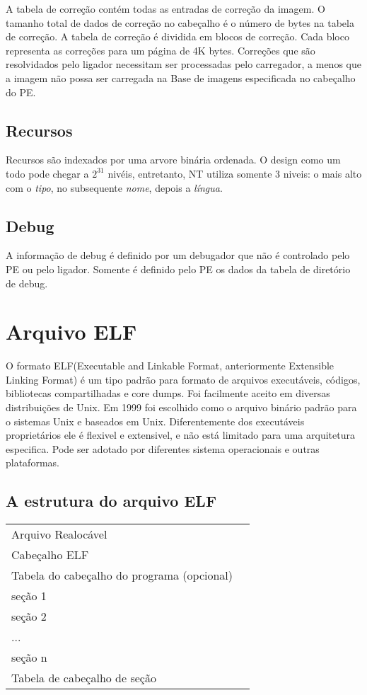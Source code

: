 A tabela de correção contém todas as entradas de correção da imagem.
O tamanho total de dados de correção no cabeçalho é o número de bytes
na tabela de correção. A tabela de correção é dividida em blocos de
correção. Cada bloco representa as correções para um página de 4K
bytes. Correções que são resolvidados pelo ligador necessitam ser
processadas pelo carregador, a menos que a imagem não possa ser carregada
na Base de imagens especificada no cabeçalho do PE.


\subsection{Recursos}


Recursos são indexados por uma arvore binária ordenada. O design
como um todo pode chegar a $2^{31}$ nivéis, entretanto, NT utiliza
somente 3 niveis: o mais alto com o \emph{tipo}, no subsequente \emph{nome},
depois a \emph{língua}.


\subsection{Debug}


A informação de debug é definido por um debugador que não é controlado
pelo PE ou pelo ligador. Somente é definido pelo PE os dados da tabela
de diretório de debug.


\section{Arquivo ELF}
   O formato ELF(Executable and Linkable Format, anteriormente Extensible Linking Format) é um tipo padrão para formato de arquivos executáveis, códigos, bibliotecas compartilhadas e core dumps. Foi facilmente aceito em diversas distribuições de Unix. 
   Em 1999 foi escolhido como o arquivo binário padrão para o sistemas Unix e baseados em Unix. Diferentemente dos executáveis proprietários ele é flexivel e extensivel, e não está limitado para uma arquitetura especifica. Pode ser adotado por diferentes sistema operacionais e outras plataformas.

\subsection{A estrutura do arquivo ELF}

\begin{list}{}
\item {\begin{tabular}{|l|c|}
\hline
 Arquivo Realocável & \tabularnewline
\cline{1-1}  
Cabeçalho ELF & \tabularnewline
\cline{1-1}
Tabela do cabeçalho do programa (opcional) & \tabularnewline
\cline{1-1} 
seção 1 & \tabularnewline
\cline{1-1} 
seção 2 & \tabularnewline
\cline{1-1} 
... & \tabularnewline
\cline{1-1}
seção n & \tabularnewline
\cline{1-1} 
Tabela de cabeçalho de seção & \tabularnewline
\cline{1-1}
\end{tabular}}
\end{list}

